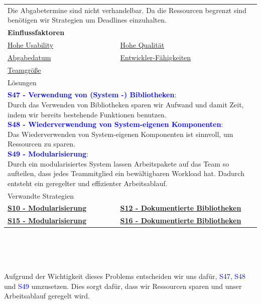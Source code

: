 \documentclass[enabledeprecatedfontcommands,fontsize=11pt,paper=a4,twoside]{scrartcl}
\newcounter{one}
\newcommand{\cb}[1]{{\textcolor{blue}{#1}}}
\begin{document}
\newpage
\begin{tabular} {|p{8cm} p{8cm}|}
	\hline
	\rowcolor{prob}\multicolumn{2}{|l|}{\parbox{16cm}{\textbf{19: Einhaltung der Abgabetermine}}} \\  \hline\hline 
	\multicolumn{2}{|l|}{\parbox{16cm}{Die Abgabetermine sind nicht verhandelbar. Da die Ressourcen begrenzt sind benötigen wir Strategien um Deadlines einzuhalten.}}\rule{0pt}{4ex}\\ [1ex] \hline
	\multicolumn{2}{|l|}{\textbf{Einflussfaktoren}}\\
	\hyperlink {g}{Hohe Usability}&
	\hyperlink {h}{Hohe Qualität}\\
	\hyperlink {uu}{Abgabedatum} &
	\hyperlink {vv}{Entwickler-Fähigkeiten} \\
	\hyperlink {xx}{Teamgröße} &
	\\ \hline
	\multicolumn{2}{|l|}{Lösungen} \\
	\multicolumn{2}{|l|}{\parbox{16cm}{
			\textbf{\cb{\hypertarget{qqq}{S47 - Verwendung von (System -) Bibliotheken}}}: \\
			Durch das Verwenden von Bibliotheken sparen wir Aufwand und damit Zeit, indem wir bereits bestehende Funktionen benutzen. \\
			\textbf{\cb{S48 - Wiederverwendung von System-eigenen Komponenten}}: \\
			Das Wiederverwenden von System-eigenen Komponenten ist sinnvoll, um Ressourcen zu sparen. \\
			\textbf{\cb{\hypertarget{aaaa}{S49 - Modularisierung}}}: \\
			Durch ein modularisiertes System lassen Arbeitspakete auf das Team so aufteilen, dass jedes Teammitglied ein bewältigbaren Workload hat. Dadurch entsteht ein geregelter und effizienter Arbeitsablauf. \\
	} }\\ [6ex] \hline
	\multicolumn{2}{|l|}{Verwandte Strategien} \\
	\textbf{\hyperlink{aadd}{S10 - Modularisierung}}&
	\textbf{\hyperlink{aaaf}{S12 - Dokumentierte Bibliotheken}}\\
	\textbf{\hyperlink{aabb}{S15 - Modularisierung}}&
	\textbf{\hyperlink{ddd}{S16 - Dokumentierte Bibliotheken}}
	\\\hline
\end{tabular}\\ \\ \\
\begin{onehalfspace}
	Aufgrund der Wichtigkeit dieses Problems entscheiden wir uns dafür, \cb{S47}, \cb{S48} und \cb{S49} umzusetzen. Dies sorgt dafür, dass wir Ressourcen sparen und unser Arbeitsablauf geregelt wird.
\end{onehalfspace}
\end{document}
